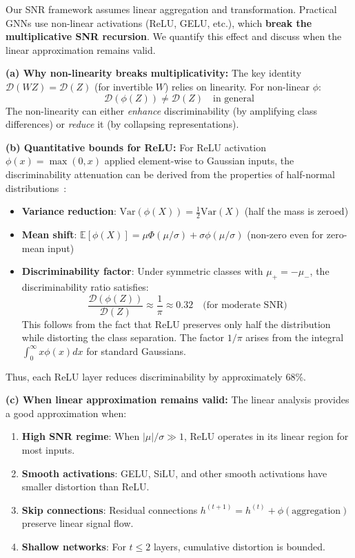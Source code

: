 \begin{remark}
\label{rem:nonlinearity_impact}
Our SNR framework assumes linear aggregation and transformation. Practical GNNs use non-linear activations (ReLU, GELU, etc.), which \textbf{break the multiplicative SNR recursion}. We quantify this effect and discuss when the linear approximation remains valid.

\textbf{(a) Why non-linearity breaks multiplicativity:}
The key identity $\mathcal{D}(WZ) = \mathcal{D}(Z)$ (for invertible $W$) relies on linearity. For non-linear $\phi$:
\begin{equation}
    \mathcal{D}(\phi(Z)) \neq \mathcal{D}(Z) \quad \text{in general}
\end{equation}
The non-linearity can either \textit{enhance} discriminability (by amplifying class differences) or \textit{reduce} it (by collapsing representations).

\textbf{(b) Quantitative bounds for ReLU:}
For ReLU activation $\phi(x) = \max(0, x)$ applied element-wise to Gaussian inputs, the discriminability attenuation can be derived from the properties of half-normal distributions~\cite{daniely2016deep}:
\begin{itemize}
    \item \textbf{Variance reduction}: $\mathrm{Var}(\phi(X)) = \frac{1}{2}\mathrm{Var}(X)$ (half the mass is zeroed)
    \item \textbf{Mean shift}: $\mathbb{E}[\phi(X)] = \mu\Phi(\mu/\sigma) + \sigma\phi(\mu/\sigma)$ (non-zero even for zero-mean input)
    \item \textbf{Discriminability factor}: Under symmetric classes with $\mu_{+} = -\mu_{-}$, the discriminability ratio satisfies:
    \begin{equation}
        \frac{\mathcal{D}(\phi(Z))}{\mathcal{D}(Z)} \approx \frac{1}{\pi} \approx 0.32 \quad \text{(for moderate SNR)}
    \end{equation}
    This follows from the fact that ReLU preserves only half the distribution while distorting the class separation. The factor $1/\pi$ arises from the integral $\int_0^\infty x \phi(x) dx$ for standard Gaussians.
\end{itemize}
Thus, each ReLU layer reduces discriminability by approximately 68\%.

\textbf{(c) When linear approximation remains valid:}
The linear analysis provides a good approximation when:
\begin{enumerate}
    \item \textbf{High SNR regime}: When $|\mu|/\sigma \gg 1$, ReLU operates in its linear region for most inputs.
    \item \textbf{Smooth activations}: GELU, SiLU, and other smooth activations have smaller distortion than ReLU.
    \item \textbf{Skip connections}: Residual connections $h^{(t+1)} = h^{(t)} + \phi(\text{aggregation})$ preserve linear signal flow.
    \item \textbf{Shallow networks}: For $t \leq 2$ layers, cumulative distortion is bounded.
\end{enumerate}


\end{remark}
